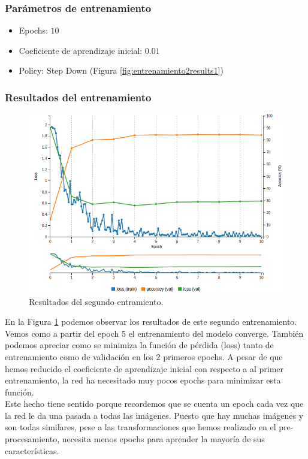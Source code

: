 \documentclass[a4paper,11pt]{book}
\begin{document}
\subsubsection{Parámetros de entrenamiento}
\begin{itemize}
	\item Epochs: \(10\)
	\item Coeficiente de aprendizaje inicial: \(0.01\)
	\item Policy: Step Down (Figura \ref{fig:entrenamiento2results1})
\end{itemize}

\subsubsection{Resultados del entrenamiento}
\begin{figure}[h]
	\centering
	\includegraphics[width=0.9\linewidth]{imagenes/entrenamiento2results}
	\caption[Resultados del entrenamiento 2]{Resultados del segundo entramiento.}
	\label{fig:entrenamiento2results}
\end{figure}

En la Figura \ref{fig:entrenamiento2results} podemos observar los resultados de este segundo entrenamiento. Vemos como a partir del epoch 5 el entrenamiento del modelo converge. También podemos apreciar como se minimiza la función de pérdida (loss) tanto de entrenamiento como de validación en los 2 primeros epochs. A pesar de que hemos reducido el coeficiente de aprendizaje inicial con respecto a al primer entrenamiento, la red ha necesitado muy pocos epochs para minimizar esta función.\\
Este hecho tiene sentido porque recordemos que se cuenta un epoch cada vez que la red le da una pasada a todas las imágenes. Puesto que hay muchas imágenes y son todas similares, pese a las transformaciones que hemos realizado en el pre-procesamiento, necesita menos epochs para aprender la mayoría de sus características.\\
\end{document}
